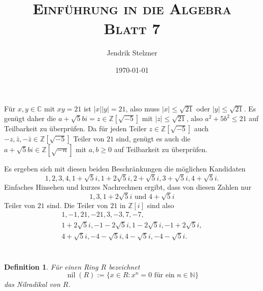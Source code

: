 \documentclass[a4paper,10pt]{article}
\title{\textsc{Einführung in die Algebra \\ \Large Blatt 7}}
\author{Jendrik Stelzner}
\date{\today}
\newtheorem*{defi}{Definition}
\theoremstyle{definition}
\newcommand{\N}{\mathbb{N}}
\newcommand{\Z}{\mathbb{Z}}
\newcommand{\C}{\mathbb{C}}
\newcommand{\nil}{\operatorname{nil}}
\begin{document}
\maketitle





\section{}





\section{}
Für $x,y \in \C$ mit $xy=21$ ist $|x||y| = 21$, also muss $|x| \leq \sqrt{21}$ oder $|y| \leq \sqrt{21}$. Es genügt daher die $a+\sqrt{5}bi = z \in \Z[\sqrt{-5}]$ mit $|z| \leq \sqrt{21}$, also $a^2 + 5b^2 \leq 21$ auf Teilbarkeit zu überprüfen. Da für jeden Teiler $z \in \Z[\sqrt{-5}]$ auch $-z, \bar{z}, -\bar{z} \in \Z[\sqrt{-5}]$ Teiler von $21$ sind, genügt es auch die $a+\sqrt{5}bi \in \Z[\sqrt{-n}]$ mit $a,b \geq 0$ auf Teilbarkeit zu überprüfen.

Es ergeben sich mit diesen beiden Beschränkungen die möglichen Kandidaten
\[
 1, 2, 3, 4, 1+\sqrt{5}i, 1+2\sqrt{5}i, 2+\sqrt{5}i, 3+\sqrt{5}i, 4+\sqrt{5}i.
\]
Einfaches Hinsehen und kurzes Nachrechnen ergibt, dass von diesen Zahlen nur
\[
 1, 3, 1+2\sqrt{5}i \text{ und } 4+\sqrt{5}i
\]
Teiler von $21$ sind. Die Teiler von $21$ in $\Z[i]$ sind also
\begin{gather*}
 1, -1, 21, -21, 3, -3, 7, -7, \\
 1+2\sqrt{5}i, -1-2\sqrt{5}i, 1-2\sqrt{5}i, -1+2\sqrt{5}i, \\
 4+\sqrt{5}i, -4-\sqrt{5}i, 4-\sqrt{5}i, -4-\sqrt{5}i.
\end{gather*}








\section{}

\begin{defi}
 Für einen Ring $R$ bezeichnet
 \[
  \nil(R) := \{x \in R : x^n = 0 \text{ für ein } n \in \N\}
 \]
 das Nilradikal von $R$.
\end{defi}
\end{document}
